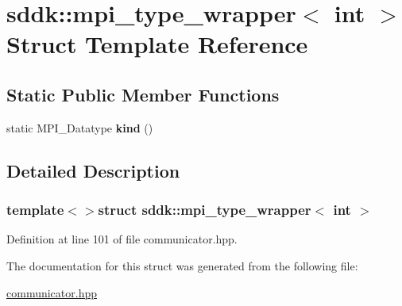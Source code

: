 \hypertarget{structsddk_1_1mpi__type__wrapper_3_01int_01_4}{}\section{sddk\+:\+:mpi\+\_\+type\+\_\+wrapper$<$ int $>$ Struct Template Reference}
\label{structsddk_1_1mpi__type__wrapper_3_01int_01_4}
\subsection*{Static Public Member Functions}
\begin{DoxyCompactItemize}
\item 
\hypertarget{structsddk_1_1mpi__type__wrapper_3_01int_01_4_a51d75c314b2a2b9f7643aef8cda3f838}{}static M\+P\+I\+\_\+\+Datatype {\bfseries kind} ()\label{structsddk_1_1mpi__type__wrapper_3_01int_01_4_a51d75c314b2a2b9f7643aef8cda3f838}

\end{DoxyCompactItemize}


\subsection{Detailed Description}
\subsubsection*{template$<$$>$struct sddk\+::mpi\+\_\+type\+\_\+wrapper$<$ int $>$}



Definition at line 101 of file communicator.\+hpp.



The documentation for this struct was generated from the following file\+:\begin{DoxyCompactItemize}
\item 
\hyperlink{communicator_8hpp}{communicator.\+hpp}\end{DoxyCompactItemize}
